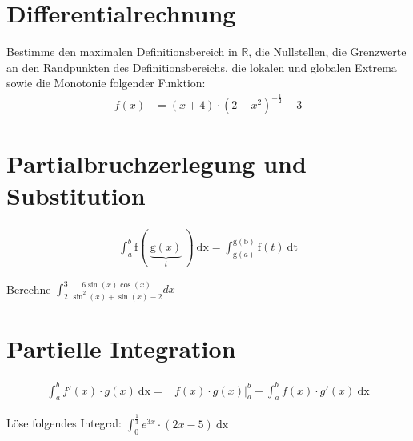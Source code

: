 \documentclass[11pt, a4paper]{article}
\providecommand{\dx}{\ \mathrm{dx}}
\providecommand{\dt}{\ \mathrm{dt}}
\begin{document}
\section{Differentialrechnung}
Bestimme den maximalen Definitionsbereich in $\mathbb{R}$, die Nullstellen, die Grenzwerte an den Randpunkten des Definitionsbereichs, die lokalen und globalen Extrema sowie die Monotonie folgender Funktion:
\begin{align*}
	f(x) &= (x+4) \cdot (2-x^2)^{-\frac{1}{2}} - 3
\end{align*}

\section{Partialbruchzerlegung und Substitution}
\begin{align}
	\int_a^b \mathrm{f}( \ \underbrace{\mathrm{g}(x)}_t \ ) \dx = \int_{\mathrm{g}(a)} ^{\mathrm{g(b)}} \mathrm{f}(t) \dt
	\label{eq:substitution}
\end{align}

Berechne $\displaystyle \int_2^3 \frac{6 \sin(x) \cos(x)}{\sin^2(x) + \sin(x) - 2 } dx$

\section{Partielle Integration}
\begin{align}
	\int_a^b f'(x) \cdot g(x) \dx =& f(x) \cdot g(x)\vert_a^b - \int_a^b f(x) \cdot g'(x) \dx
	\label{eq:partielleIntegration}
\end{align}

\newcommand{\lowerBorder}{{0}}
\newcommand{\upperBorder}{{\frac{1}{3}}}
Löse folgendes Integral: $\displaystyle \int_\lowerBorder^\upperBorder e^{3x} \cdot (2x - 5) \dx$
\end{document}
